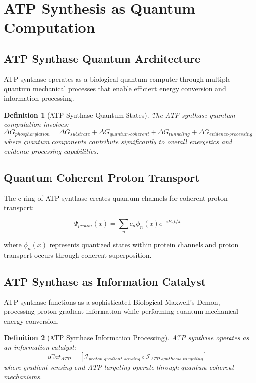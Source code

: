 \documentclass[12pt,a4paper]{article}
\newtheorem{definition}{Definition}
\begin{document}
\section{ATP Synthesis as Quantum Computation}

\subsection{ATP Synthase Quantum Architecture}

ATP synthase operates as a biological quantum computer through multiple quantum mechanical processes that enable efficient energy conversion and information processing.

\begin{definition}[ATP Synthase Quantum States]
The ATP synthase quantum computation involves:
\begin{equation}
\Delta G_{phosphorylation} = \Delta G_{substrate} + \Delta G_{quantum\text{-}coherent} + \Delta G_{tunneling} + \Delta G_{evidence\text{-}processing}
\end{equation}
where quantum components contribute significantly to overall energetics and evidence processing capabilities.
\end{definition}

\subsection{Quantum Coherent Proton Transport}

The c-ring of ATP synthase creates quantum channels for coherent proton transport:

\begin{equation}
\Psi_{proton}(x) = \sum_{n} c_n \phi_n(x) e^{-iE_n t/\hbar}
\end{equation}

where $\phi_n(x)$ represents quantized states within protein channels and proton transport occurs through coherent superposition.

\subsection{ATP Synthase as Information Catalyst}

ATP synthase functions as a sophisticated Biological Maxwell's Demon, processing proton gradient information while performing quantum mechanical energy conversion.

\begin{definition}[ATP Synthase Information Processing]
ATP synthase operates as an information catalyst:
\begin{equation}
iCat_{ATP} = [\mathcal{I}_{proton\text{-}gradient\text{-}sensing} \circ \mathcal{I}_{ATP\text{-}synthesis\text{-}targeting}]
\end{equation}
where gradient sensing and ATP targeting operate through quantum coherent mechanisms.
\end{definition}
\end{document}
